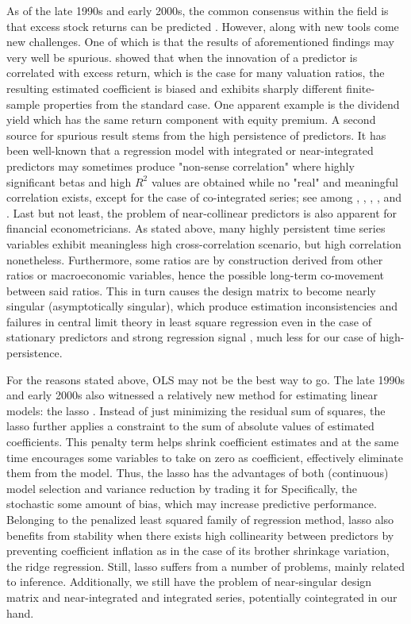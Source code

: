 \documentclass[12pt,a4paper]{article}
\begin{document}
As of the late 1990s and early 2000s, the common consensus within the field is that excess stock returns can be predicted \citep{welch2008comprehensive}. However, along with new tools come new challenges. One of which is that the results of aforementioned findings may very well be spurious. \citep{stambaugh1999predictive} showed that when the innovation of a predictor is correlated with excess return, which is the case for many valuation ratios, the resulting estimated coefficient is biased and exhibits sharply different finite-sample properties from the standard case. One apparent example is the dividend yield which has the same return component with equity premium. A second source for spurious result stems from the high persistence of predictors. It has been well-known that a regression model with integrated or near-integrated predictors may sometimes produce "non-sense correlation" where highly significant betas and high $ R^2 $ values are obtained while no "real" and meaningful correlation exists, except for the case of co-integrated series; see among \cite{yule1926we}, \cite{granger1974spurious}, \cite{phillips1986understanding}, \cite{granger2001spurious}, and \cite{engle1987co}. Last but not least, the problem of near-collinear predictors is also apparent for financial econometricians. As stated above, many highly persistent time series variables exhibit meaningless high cross-correlation scenario, but high correlation nonetheless. Furthermore, some ratios are by construction derived from other ratios or macroeconomic variables, hence the possible long-term co-movement between said ratios. This in turn causes the design matrix to become nearly singular (asymptotically singular), which produce estimation inconsistencies and failures in central limit theory in least square regression even in the case of stationary predictors and strong regression signal \citep{phillips2016inference}, much less for our case of high-persistence.

For the reasons stated above, OLS may not be the best way to go. The late 1990s and early 2000s also witnessed a relatively new method for estimating linear models: the lasso \citep{tibshirani1996regression}. Instead of just minimizing the residual sum of squares, the lasso further applies a constraint to the sum of absolute values of estimated coefficients. This penalty term helps shrink coefficient estimates and at the same time encourages some variables to take on zero as coefficient, effectively eliminate them from the model. Thus, the lasso has the advantages of both (continuous) model selection and variance reduction by trading it for Specifically, the stochastic some amount of bias, which may increase predictive performance. Belonging to the penalized least squared family of regression method, lasso also benefits from stability when there exists high collinearity between predictors by preventing coefficient inflation as in the case of its brother shrinkage variation, the ridge regression. Still, lasso suffers from a number of problems, mainly related to inference. Additionally, we still have the problem of near-singular design matrix and near-integrated and integrated series, potentially cointegrated in our hand.
\end{document}
